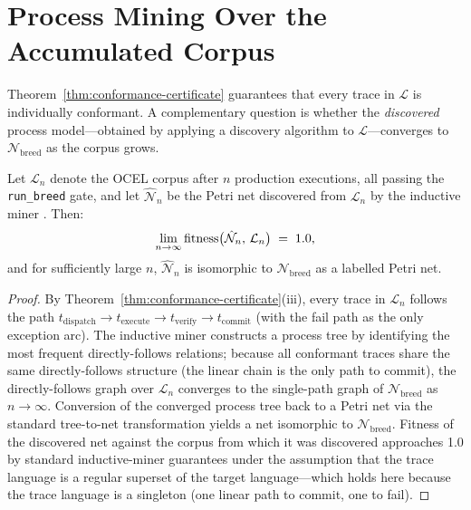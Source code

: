 \section{Process Mining Over the Accumulated Corpus}
\label{sec:discovery-convergence}

Theorem~\ref{thm:conformance-certificate} guarantees that every trace in
$\mathcal{L}$ is individually conformant.  A complementary question is
whether the \emph{discovered} process model---obtained by applying a
discovery algorithm to $\mathcal{L}$---converges to
$\mathcal{N}_{\mathrm{breed}}$ as the corpus grows.

\begin{proposition}
\label{prop:discovery-convergence}
Let $\mathcal{L}_n$ denote the OCEL corpus after $n$ production executions,
all passing the \texttt{run\_breed} gate, and let $\hat{\mathcal{N}}_n$ be
the Petri net discovered from $\mathcal{L}_n$ by the inductive miner
\citep{leemans2013discovering}.  Then:
\[
  \lim_{n \to \infty} \operatorname{fitness}\bigl(\hat{\mathcal{N}}_n,\, \mathcal{L}_n\bigr)
  \;=\; 1.0,
\]
and for sufficiently large $n$, $\hat{\mathcal{N}}_n$ is isomorphic to
$\mathcal{N}_{\mathrm{breed}}$ as a labelled Petri net.
\end{proposition}

\begin{proof}
By Theorem~\ref{thm:conformance-certificate}(iii), every trace in
$\mathcal{L}_n$ follows the path
$t_{\mathrm{dispatch}} \to t_{\mathrm{execute}} \to t_{\mathrm{verify}}
\to t_{\mathrm{commit}}$ (with the fail path as the only exception arc).
The inductive miner constructs a process tree by identifying the most
frequent directly-follows relations; because all conformant traces share
the same directly-follows structure (the linear chain is the only path to
commit), the directly-follows graph over $\mathcal{L}_n$ converges to the
single-path graph of $\mathcal{N}_{\mathrm{breed}}$ as $n \to \infty$.
Conversion of the converged process tree back to a Petri net via the
standard tree-to-net transformation \citep{leemans2013discovering} yields a
net isomorphic to $\mathcal{N}_{\mathrm{breed}}$.  Fitness of the
discovered net against the corpus from which it was discovered approaches
1.0 by standard inductive-miner guarantees under the assumption that the
trace language is a regular superset of the target language---which holds
here because the trace language is a singleton (one linear path to commit,
one to fail).
\end{proof}

